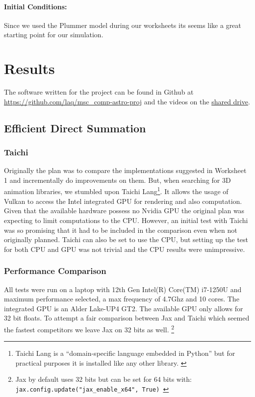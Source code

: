 \documentclass[a4paper, 11pt]{article}         %
\begin{document}
\paragraph{Initial Conditions:}
Since we used the Plummer model during our worksheets its seems like a great starting point for our simulation. \parencite{ws5,ws7}



\section{Results}
The software written for the project can be found in Github at \url{https://github.com/laq/msc_comp-astro-proj} and the videos on the \href{https://drive.google.com/drive/folders/17HjF1KmQAJzP7fJ5GMh5vFHURGo9tkBM?usp=sharing}{shared drive}.


\subsection{Efficient Direct Summation}
\subsubsection{Taichi}
Originally the plan was to compare the implementations suggested in Worksheet 1\parencite{ws1} and incrementally do improvements on them. But, when searching for 3D animation libraries, we stumbled upon
Taichi Lang\footnote{Taichi Lang is a ``domain-specific language embedded in Python'' but for practical purposes it is installed like any other library. \parencite{TaichiLang}}. It allows the usage of Vulkan\parencite{Vulkan} to access the Intel integrated GPU for rendering and also computation.
Given that the available hardware possess no Nvidia GPU the original plan was expecting to limit computations to the CPU. However, an initial test with Taichi was so promising that it had to be included in the comparison even when not originally planned. Taichi can also be set to use the CPU, but setting up the test for both CPU and GPU was not trivial and the CPU results were unimpressive.

\subsubsection{Performance Comparison}

All tests were run on a laptop with 12th Gen Intel(R) Core(TM) i7-1250U and maximum performance selected, a max frequency of 4.7Ghz and 10 cores. The integrated GPU is an Alder Lake-UP4 GT2.
The available GPU only allows for 32 bit floats. To attempt a fair comparison between Jax and Taichi which seemed the fastest competitors we leave Jax on 32 bits as well. \footnote{Jax by default uses 32 bits but can be set for 64 bits with: \texttt{jax.config.update("jax\_enable\_x64", True) }}
\end{document}
